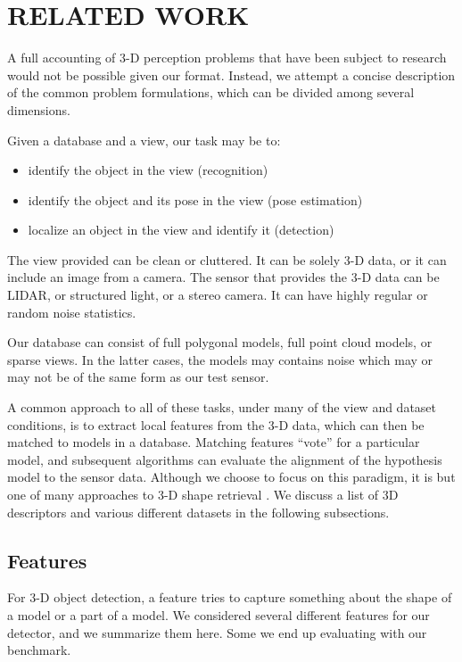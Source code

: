 \section{RELATED WORK}

A full accounting of 3-D perception problems that have been subject to research would not be possible given our format.
Instead, we attempt a concise description of the common problem formulations, which can be divided among several dimensions.

Given a database and a view, our task may be to:
\begin{itemize}
\item identify the object in the view (recognition)
\item identify the object and its pose in the view (pose estimation)
\item localize an object in the view and identify it (detection)
\end{itemize}

The view provided can be clean or cluttered.
It can be solely 3-D data, or it can include an image from a camera.
The sensor that provides the 3-D data can be LIDAR, or structured light, or a stereo camera.
It can have highly regular or random noise statistics.

Our database can consist of full polygonal models, full point cloud models, or sparse views.
In the latter cases, the models may contains noise which may or may not be of the same form as our test sensor.

A common approach to all of these tasks, under many of the view and dataset conditions, is to extract local features from the 3-D data, which can then be matched to models in a database.
Matching features ``vote'' for a particular model, and subsequent algorithms can evaluate the alignment of the hypothesis model to the sensor data.
Although we choose to focus on this paradigm, it is but one of many approaches to 3-D shape retrieval \cite{Tangelder2004}. We discuss a list of 3D descriptors and various different datasets in the following subsections.

\subsection{Features}
For 3-D object detection, a feature tries to capture something about the shape of a model or a part of a model.
We considered several different features for our detector, and we summarize them here.
Some we end up evaluating with our benchmark.

